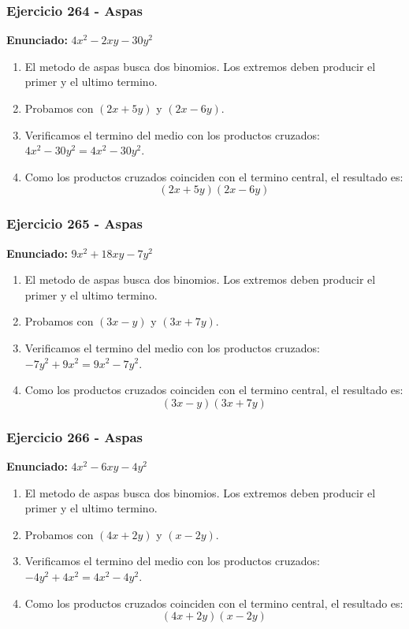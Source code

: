 \documentclass[11pt,a4paper]{article}
\begin{document}
\vspace{0.2cm}
\subsubsection*{Ejercicio 264 - Aspas}
\textbf{Enunciado:} $ 4 x^{2} - 2 x y - 30 y^{2} $\par
\begin{enumerate}[leftmargin=2em]
\item El metodo de aspas busca dos binomios. Los extremos deben producir el primer y el ultimo termino.
\item Probamos con \((2 x + 5 y)\) y \((2 x - 6 y)\).
\item Verificamos el termino del medio con los productos cruzados: \(4 x^{2}- 30 y^{2}=4 x^{2} - 30 y^{2}\).
\item Como los productos cruzados coinciden con el termino central, el resultado es: \[\boxed{\left(2 x + 5 y\right)\left(2 x - 6 y\right)}\]
\end{enumerate}

\vspace{0.2cm}
\subsubsection*{Ejercicio 265 - Aspas}
\textbf{Enunciado:} $ 9 x^{2} + 18 x y - 7 y^{2} $\par
\begin{enumerate}[leftmargin=2em]
\item El metodo de aspas busca dos binomios. Los extremos deben producir el primer y el ultimo termino.
\item Probamos con \((3 x - y)\) y \((3 x + 7 y)\).
\item Verificamos el termino del medio con los productos cruzados: \(- 7 y^{2}+9 x^{2}=9 x^{2} - 7 y^{2}\).
\item Como los productos cruzados coinciden con el termino central, el resultado es: \[\boxed{\left(3 x - y\right)\left(3 x + 7 y\right)}\]
\end{enumerate}

\vspace{0.2cm}
\subsubsection*{Ejercicio 266 - Aspas}
\textbf{Enunciado:} $ 4 x^{2} - 6 x y - 4 y^{2} $\par
\begin{enumerate}[leftmargin=2em]
\item El metodo de aspas busca dos binomios. Los extremos deben producir el primer y el ultimo termino.
\item Probamos con \((4 x + 2 y)\) y \((x - 2 y)\).
\item Verificamos el termino del medio con los productos cruzados: \(- 4 y^{2}+4 x^{2}=4 x^{2} - 4 y^{2}\).
\item Como los productos cruzados coinciden con el termino central, el resultado es: \[\boxed{\left(4 x + 2 y\right)\left(x - 2 y\right)}\]
\end{enumerate}
\end{document}
